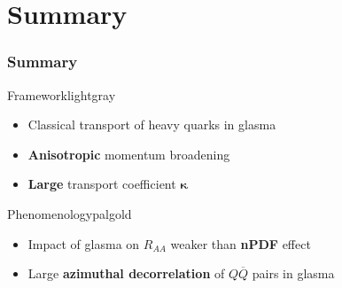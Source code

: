 \documentclass[aspectratio=169,11pt,usenames,dvipsnames]{beamer}
\begin{document}

\section{Summary}
\begin{frame}
    \frametitle{Summary}
    \begin{center}
        \begin{custombox2}{Framework}{lightgray}
            \small
            \begin{varwidth}{0.51\textwidth}
            \begin{itemize}\itemsep0em 
                \itemsep0em
                \item Classical transport of heavy quarks in glasma
                \item \textbf{Anisotropic} momentum broadening
                \item \textbf{Large} transport coefficient $\boldsymbol{\kappa}$
            \end{itemize}
            \end{varwidth}
        \end{custombox2}


        \begin{custombox2}{Phenomenology}{palgold}
            \small
            \begin{varwidth}{0.62\textwidth}
            \begin{itemize}\itemsep0em 
                \itemsep0em
                \item Impact of glasma on $R_{AA}$ weaker than \textbf{\color{palgold}nPDF} effect
                \item Large \textbf{\color{palgold}azimuthal decorrelation} of $Q\overline{Q}$ pairs in glasma
            \end{itemize}
            \end{varwidth}
        \end{custombox2}


\end{center}
\end{frame}
\end{document}
